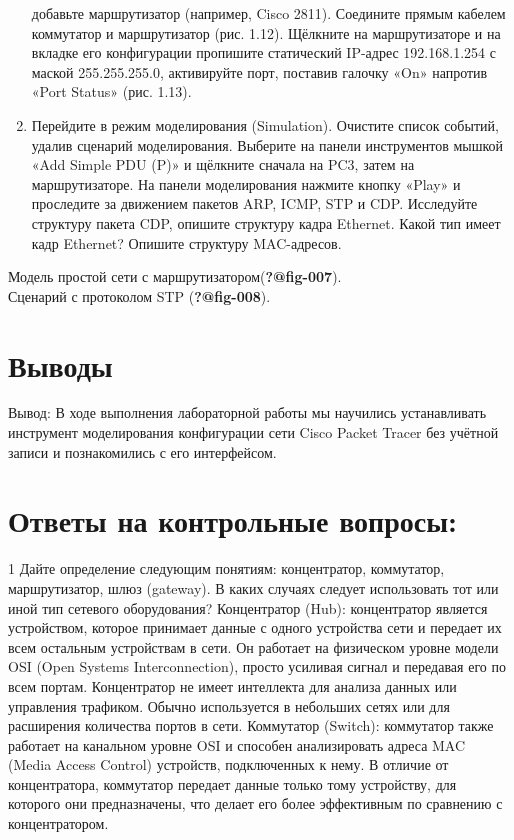 \documentclass[
  english,
  russian,
  12pt,
  a4paper,
  DIV=11,
  numbers=noendperiod]{scrreprt}
\begin{document}
\begin{enumerate}
  добавьте маршрутизатор (например, Cisco 2811). Соедините прямым
  кабелем коммутатор и маршрутизатор (рис. 1.12). Щёлкните на
  маршрутизаторе и на вкладке его конфигурации пропишите статический
  IP-адрес 192.168.1.254 с маской 255.255.255.0, активируйте порт,
  поставив галочку «On» напротив «Port Status» (рис. 1.13).
\item
  Перейдите в режим моделирования (Simulation). Очистите список событий,
  удалив сценарий моделирования. Выберите на панели инструментов мышкой
  «Add Simple PDU (P)» и щёлкните сначала на PC3, затем на
  маршрутизаторе. На панели моделирования нажмите кнопку «Play» и
  проследите за движением пакетов ARP, ICMP, STP и CDP. Исследуйте
  структуру пакета CDP, опишите структуру кадра Ethernet. Какой тип
  имеет кадр Ethernet? Опишите структуру MAC-адресов.
\end{enumerate}

Модель простой сети с маршрутизатором(\textbf{?@fig-007}).\\
Сценарий с протоколом STP (\textbf{?@fig-008}).

\chapter{Выводы}\label{ux432ux44bux432ux43eux434ux44b}

Вывод: В ходе выполнения лабораторной работы мы научились устанавливать
инструмент моделирования конфигурации сети Cisco Packet Tracer без
учётной записи и познакомились с его интерфейсом.

\chapter{Ответы на контрольные
вопросы:}\label{ux43eux442ux432ux435ux442ux44b-ux43dux430-ux43aux43eux43dux442ux440ux43eux43bux44cux43dux44bux435-ux432ux43eux43fux440ux43eux441ux44b}

1 Дайте определение следующим понятиям: концентратор, коммутатор,
маршрутизатор, шлюз (gateway). В каких случаях следует использовать тот
или иной тип сетевого оборудования? Концентратор (Hub): концентратор
является устройством, которое принимает данные с одного устройства сети
и передает их всем остальным устройствам в сети. Он работает на
физическом уровне модели OSI (Open Systems Interconnection), просто
усиливая сигнал и передавая его по всем портам. Концентратор не имеет
интеллекта для анализа данных или управления трафиком. Обычно
используется в небольших сетях или для расширения количества портов в
сети. Коммутатор (Switch): коммутатор также работает на канальном уровне
OSI и способен анализировать адреса MAC (Media Access Control)
устройств, подключенных к нему. В отличие от концентратора, коммутатор
передает данные только тому устройству, для которого они предназначены,
что делает его более эффективным по сравнению с концентратором.

\printbibliography[heading=none]
\end{document}
